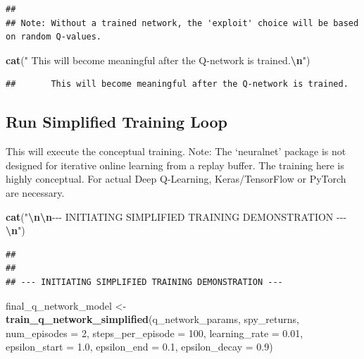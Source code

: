 \documentclass[
]{article}
\newenvironment{Shaded}{\begin{snugshade}}{\end{snugshade}}
\newcommand{\AttributeTok}[1]{\textcolor[rgb]{0.13,0.29,0.53}{#1}}
\newcommand{\DecValTok}[1]{\textcolor[rgb]{0.00,0.00,0.81}{#1}}
\newcommand{\FloatTok}[1]{\textcolor[rgb]{0.00,0.00,0.81}{#1}}
\newcommand{\FunctionTok}[1]{\textcolor[rgb]{0.13,0.29,0.53}{\textbf{#1}}}
\newcommand{\NormalTok}[1]{#1}
\newcommand{\OtherTok}[1]{\textcolor[rgb]{0.56,0.35,0.01}{#1}}
\newcommand{\SpecialCharTok}[1]{\textcolor[rgb]{0.81,0.36,0.00}{\textbf{#1}}}
\newcommand{\StringTok}[1]{\textcolor[rgb]{0.31,0.60,0.02}{#1}}
\begin{document}
\begin{verbatim}
## 
## Note: Without a trained network, the 'exploit' choice will be based on random Q-values.
\end{verbatim}

\begin{Shaded}
\begin{Highlighting}[]
\FunctionTok{cat}\NormalTok{(}\StringTok{"      This will become meaningful after the Q{-}network is trained.}\SpecialCharTok{\textbackslash{}n}\StringTok{"}\NormalTok{)}
\end{Highlighting}
\end{Shaded}

\begin{verbatim}
##       This will become meaningful after the Q-network is trained.
\end{verbatim}

\hypertarget{run-simplified-training-loop}{%
\subsection{Run Simplified Training
Loop}\label{run-simplified-training-loop}}

This will execute the conceptual training. Note: The `neuralnet' package
is not designed for iterative online learning from a replay buffer. The
training here is highly conceptual. For actual Deep Q-Learning,
Keras/TensorFlow or PyTorch are necessary.

\begin{Shaded}
\begin{Highlighting}[]
\FunctionTok{cat}\NormalTok{(}\StringTok{"}\SpecialCharTok{\textbackslash{}n\textbackslash{}n}\StringTok{{-}{-}{-} INITIATING SIMPLIFIED TRAINING DEMONSTRATION {-}{-}{-}}\SpecialCharTok{\textbackslash{}n}\StringTok{"}\NormalTok{)}
\end{Highlighting}
\end{Shaded}

\begin{verbatim}
## 
## 
## --- INITIATING SIMPLIFIED TRAINING DEMONSTRATION ---
\end{verbatim}

\begin{Shaded}
\begin{Highlighting}[]
\NormalTok{final\_q\_network\_model }\OtherTok{\textless{}{-}} \FunctionTok{train\_q\_network\_simplified}\NormalTok{(q\_network\_params, spy\_returns,}
                                                    \AttributeTok{num\_episodes =} \DecValTok{2}\NormalTok{, }\AttributeTok{steps\_per\_episode =} \DecValTok{100}\NormalTok{,}
                                                    \AttributeTok{learning\_rate =} \FloatTok{0.01}\NormalTok{,}
                                                    \AttributeTok{epsilon\_start =} \FloatTok{1.0}\NormalTok{, }\AttributeTok{epsilon\_end =} \FloatTok{0.1}\NormalTok{, }\AttributeTok{epsilon\_decay =} \FloatTok{0.9}\NormalTok{)}
\end{Highlighting}
\end{Shaded}
\end{document}
